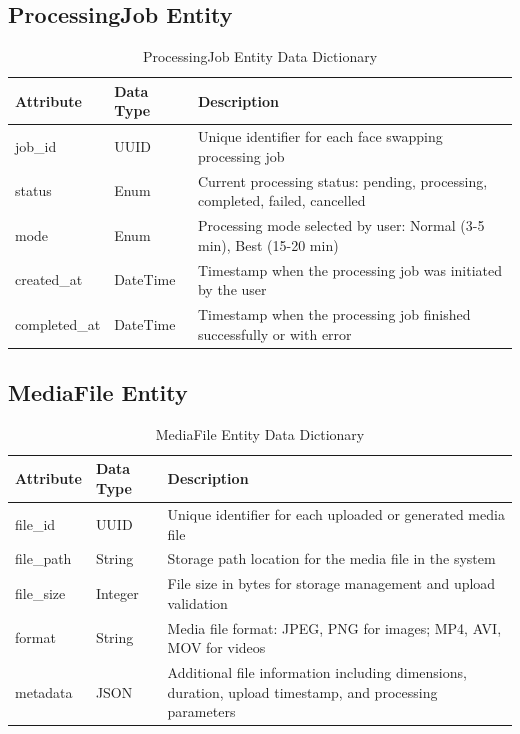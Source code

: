 \documentclass[12pt,a4paper]{report}
\begin{document}
\subsection{ProcessingJob Entity}

\begin{table}[H]
\centering
\caption{ProcessingJob Entity Data Dictionary}
\label{tab:processing_job_entity}
\begin{tabular}{|p{3cm}|p{2.5cm}|p{6.5cm}|}
\hline
\textbf{Attribute} & \textbf{Data Type} & \textbf{Description} \\
\hline
job\_id & UUID & Unique identifier for each face swapping processing job \\
\hline
status & Enum & Current processing status: pending, processing, completed, failed, cancelled \\
\hline
mode & Enum & Processing mode selected by user: Normal (3-5 min), Best (15-20 min) \\
\hline
created\_at & DateTime & Timestamp when the processing job was initiated by the user \\
\hline
completed\_at & DateTime & Timestamp when the processing job finished successfully or with error \\
\hline
\end{tabular}
\end{table}

\subsection{MediaFile Entity}

\begin{table}[H]
\centering
\caption{MediaFile Entity Data Dictionary}
\label{tab:media_file_entity}
\begin{tabular}{|p{3cm}|p{2.5cm}|p{6.5cm}|}
\hline
\textbf{Attribute} & \textbf{Data Type} & \textbf{Description} \\
\hline
file\_id & UUID & Unique identifier for each uploaded or generated media file \\
\hline
file\_path & String & Storage path location for the media file in the system \\
\hline
file\_size & Integer & File size in bytes for storage management and upload validation \\
\hline
format & String & Media file format: JPEG, PNG for images; MP4, AVI, MOV for videos \\
\hline
metadata & JSON & Additional file information including dimensions, duration, upload timestamp, and processing parameters \\
\hline
\end{tabular}
\end{table}
\end{document}
